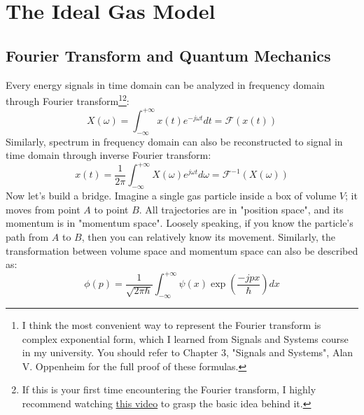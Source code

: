 \documentclass[~/PhyAI/phyai.tex]{subfiles}
\begin{document}
\section{The Ideal Gas Model}\label{sec:the_ideal_gas_model} %
\subsection{Fourier Transform and Quantum Mechanics}
Every energy signals in time domain can be analyzed in frequency domain through Fourier transform\footnote[1]{I think the most convenient way to represent the Fourier transform is complex exponential form, which I learned from Signals and Systems course in my university. You should refer to Chapter 3, "Signals and Systems", Alan V. Oppenheim for the full proof of these formulas.}\footnote[2]{If this is your first time encountering the Fourier transform, I highly recommend watching \href{https://youtu.be/PRUn5Alm6Vk?si=fncmV6eVDB1_hrNu}{this video} to grasp the basic idea behind it.}:
$$ X(\omega)=\int_{-\infty }^{+\infty}x(t)e^{-j\omega t}dt=\mathcal{F}(x(t))  $$
Similarly, spectrum in frequency domain can also be reconstructed to signal in time domain through inverse Fourier transform:
$$ x(t)=\frac{1}{2\pi}\int_{-\infty }^{+\infty}X(\omega)e^{j\omega t}d\omega=\mathcal{F}^{-1}(X(\omega))  $$
Now let's build a bridge. Imagine a single gas particle inside a box of volume $V$; it moves from point $A$ to point $B$. All trajectories are in "position space", and its momentum is in "momentum space". Loosely speaking, if you know the particle's path from $A$ to $B$, then you can relatively know its movement. Similarly, the transformation between volume space and momentum space can also be described as:
$$ \phi(p)=\frac{1 }{\sqrt{2\pi\hbar}}\int_{-\infty }^{+\infty}\psi(x)\exp{\left({\frac{-jpx }{\hbar}}\right)}dx  $$
\end{document}
